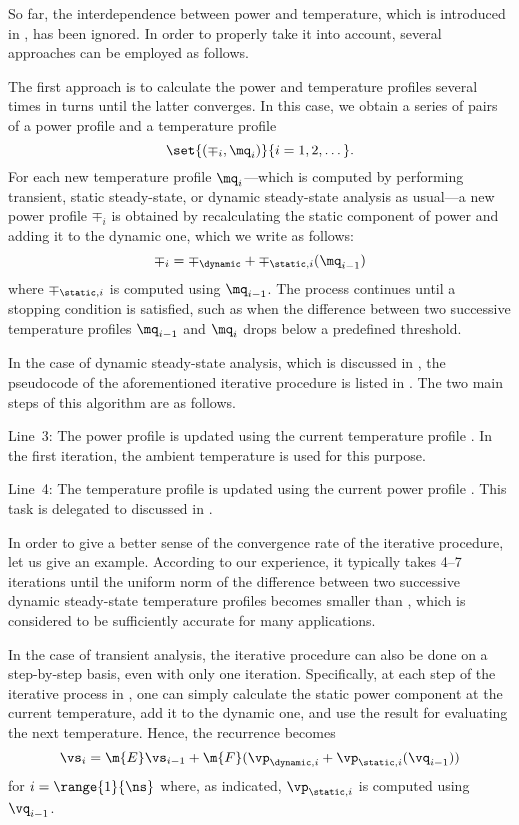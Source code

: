 So far, the interdependence between power and temperature, which is introduced
in , has been ignored. In order to properly take it into
account, several approaches can be employed as follows.

The first approach is to calculate the power and temperature profiles several
times in turns until the latter converges. In this case, we obtain a series of
pairs of a power profile and a temperature profile
\[
  \set{(\mp_i, \mq_i)}{i = 1, 2, \dots}.
\]
For each new temperature profile $\mq_i$---which is computed by performing
transient, static steady-state, or dynamic steady-state analysis as usual---a
new power profile $\mp_i$ is obtained by recalculating the static component of
power and adding it to the dynamic one, which we write as follows:
\[
  \mp_i = \mp_\dynamic + \mp_{\static, i}(\mq_{i - 1})
\]
where $\mp_{\static, i}$ is computed using $\mq_{i - 1}$. The process continues
until a stopping condition is satisfied, such as when the difference between two
successive temperature profiles $\mq_{i - 1}$ and $\mq_i$ drops below a
predefined threshold.

In the case of dynamic steady-state analysis, which is discussed in
, the pseudocode of the aforementioned iterative
procedure is listed in . The two
main steps of this algorithm are as follows.

Line~3: The power profile \mp is updated using the current temperature profile
\mq. In the first iteration, the ambient temperature is used for this purpose.

Line~4: The temperature profile \mq is updated using the current power profile
\mp. This task is delegated to  discussed in
.

In order to give a better sense of the convergence rate of the iterative
procedure, let us give an example. According to our experience, it typically
takes 4--7 iterations until the uniform norm of the difference between two
successive dynamic steady-state temperature profiles becomes smaller than
, which is considered to be sufficiently accurate for many
applications.

In the case of transient analysis, the iterative procedure can also be done on a
step-by-step basis, even with only one iteration. Specifically, at each step of
the iterative process in , one can simply calculate
the static power component at the current temperature, add it to the dynamic
one, and use the result for evaluating the next temperature. Hence, the
recurrence becomes
\[
  \vs_i = \m{E} \vs_{i - 1} + \m{F} (\vp_{\dynamic, i} + \vp_{\static, i}(\vq_{i - 1}))
\]
for $i = \range{1}{\ns}$ where, as indicated, $\vp_{\static, i}$ is computed
using $\vq_{i - 1}$.

